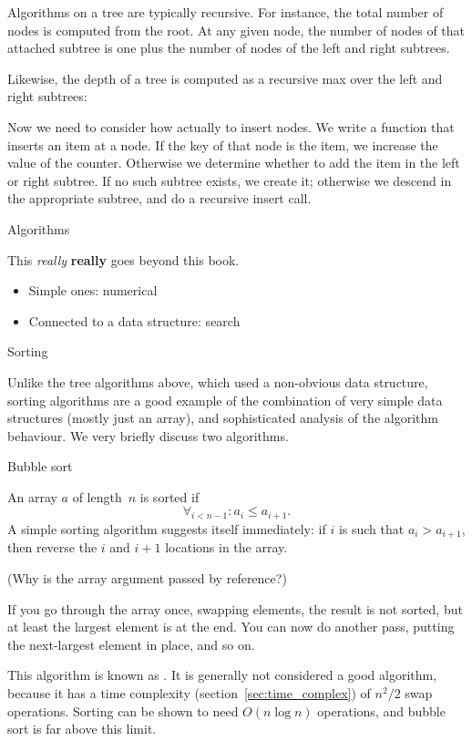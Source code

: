 Algorithms on a tree are typically recursive. For instance, the total
number of nodes is computed from the root. At any given node, the
number of nodes of that attached subtree is one plus the number of
nodes of the left and right subtrees.
%

Likewise, the depth of a tree is computed as a recursive max over the
left and right subtrees:
%

Now we need to consider how actually to insert nodes. We write a
function that inserts an item at a node. If the key of that node is
the item, we increase the value of the counter. Otherwise we determine
whether to add the item in the left or right subtree. If no such
subtree exists, we create it; otherwise we descend in the appropriate
subtree, and do a recursive insert call.
%

 {Algorithms}

This \emph{really} \textbf{really} goes beyond this book.

\begin{itemize}
\item Simple ones: numerical
\item Connected to a data structure: search
\end{itemize}

 {Sorting}

Unlike the tree algorithms above, which used a non-obvious data
structure,
sorting algorithms are a good example of the combination of very
simple data structures (mostly just an array), and sophisticated
analysis of the algorithm behaviour. We very briefly discuss two
algorithms.

 {Bubble sort}

An array $a$ of length~$n$ is sorted if
\[ \forall_{i<n-1}\colon a_i\leq a_{i+1}. \]
A simple sorting algorithm suggests itself immediately: if $i$ is such
that $a_i>a_{i+1}$, then reverse the $i$ and $i+1$ locations in the
array.


(Why is the array argument passed by reference?)

If you go through the array once, swapping elements, the result is not
sorted, but at least the largest element is at the end. You can now do
another pass, putting the next-largest element in place, and so on.

This algorithm is known as . It is generally
not considered a good algorithm, because it has a time complexity
(section~\ref{sec:time_complex}) of $n^2/2$ swap operations. Sorting
can be shown to need $O(n\log n)$ operations, and bubble sort is far
above this limit.


